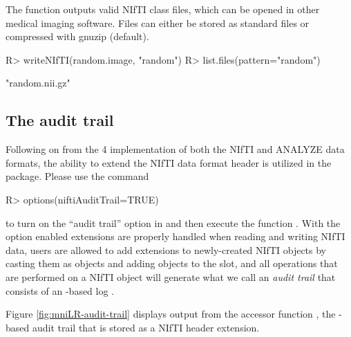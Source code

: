 \documentclass[
]{article}
\begin{document}
The function  outputs valid NIfTI class files, which
can be opened in other medical imaging software. Files can either be
stored as standard  files or compressed with gnuzip
(default).

\begin{CodeChunk}

\begin{CodeInput}
R> writeNIfTI(random.image, "random")
R> list.files(pattern="random")
\end{CodeInput}

\begin{CodeOutput}
[1] "random.nii.gz"
\end{CodeOutput}
\end{CodeChunk}

\subsection{The audit trail}

Following on from the 4 implementation of both the NIfTI and
ANALYZE data formats, the ability to extend the NIfTI data format header
is utilized in the  package. Please use the command

\begin{CodeChunk}

\begin{CodeInput}
R> options(niftiAuditTrail=TRUE)
\end{CodeInput}
\end{CodeChunk}

to turn on the ``audit trail'' option in  and then
execute the function . With the option enabled
extensions are properly handled when reading and writing NIfTI data,
users are allowed to add extensions to newly-created NIfTI objects by
casting them as  objects and adding
 objects to the  slot, and
all operations that are performed on a NIfTI object will generate what
we call an \emph{audit trail} that consists of an -based
log \citep{XML}.

Figure \ref{fig:mniLR-audit-trail} displays output from the accessor
function , the -based audit trail
that is stored as a NIfTI header extension.
\end{document}
